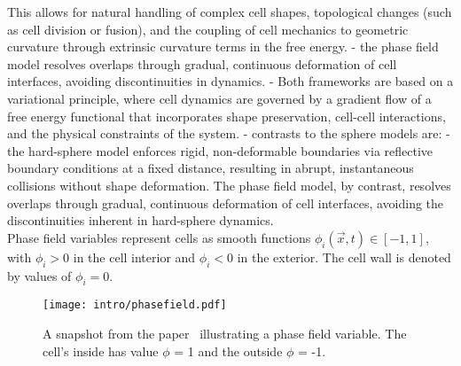 This allows for natural handling of complex cell shapes, topological changes (such as cell division or fusion), and the coupling of cell mechanics to geometric curvature through extrinsic curvature terms in the free energy. 
- the phase field model resolves overlaps through gradual, continuous deformation of cell interfaces, avoiding discontinuities in dynamics. 
- Both frameworks are based on a variational principle, where cell dynamics are governed by a gradient flow of a free energy functional that incorporates shape preservation, cell-cell interactions, and the physical constraints of the system. 
- contrasts to the sphere models are: 
- the hard-sphere model enforces rigid, non-deformable boundaries via reflective boundary conditions at a fixed distance, resulting in abrupt, instantaneous collisions without shape deformation.  The phase field model, by contrast, resolves overlaps through gradual, continuous deformation of cell interfaces, avoiding the discontinuities inherent in hard-sphere dynamics. \\

Phase field variables represent cells as smooth functions $\phi_i(\vec{x}, t) \in [-1, 1]$, with $\phi_i > 0$ in the cell interior and $\phi_i <0$ in the exterior. 
The cell wall is denoted by values of $\phi_i = 0$. \\
\begin{figure}[h!]
	\centering
	\texttt{[image: intro/phasefield.pdf]}
	\caption{A snapshot from the paper~\cite{alert2020} illustrating a phase field variable. The cell's inside has value $\phi$ = 1 and the outside $\phi$ = -1. 
	}
	\label{fig:phasefield}
\end{figure}
	
